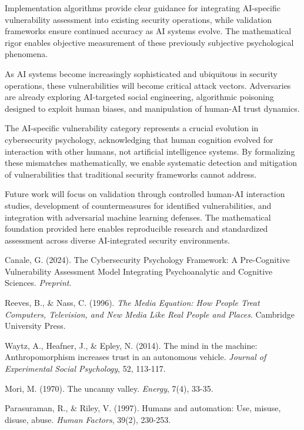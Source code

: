 \documentclass[11pt,a4paper]{article}
\begin{document}
Implementation algorithms provide clear guidance for integrating AI-specific vulnerability assessment into existing security operations, while validation frameworks ensure continued accuracy as AI systems evolve. The mathematical rigor enables objective measurement of these previously subjective psychological phenomena.

As AI systems become increasingly sophisticated and ubiquitous in security operations, these vulnerabilities will become critical attack vectors. Adversaries are already exploring AI-targeted social engineering, algorithmic poisoning designed to exploit human biases, and manipulation of human-AI trust dynamics.

The AI-specific vulnerability category represents a crucial evolution in cybersecurity psychology, acknowledging that human cognition evolved for interaction with other humans, not artificial intelligence systems. By formalizing these mismatches mathematically, we enable systematic detection and mitigation of vulnerabilities that traditional security frameworks cannot address.

Future work will focus on validation through controlled human-AI interaction studies, development of countermeasures for identified vulnerabilities, and integration with adversarial machine learning defenses. The mathematical foundation provided here enables reproducible research and standardized assessment across diverse AI-integrated security environments.

\begin{thebibliography}{9}

Canale, G. (2024). The Cybersecurity Psychology Framework: A Pre-Cognitive Vulnerability Assessment Model Integrating Psychoanalytic and Cognitive Sciences. \textit{Preprint}.

Reeves, B., \& Nass, C. (1996). \textit{The Media Equation: How People Treat Computers, Television, and New Media Like Real People and Places}. Cambridge University Press.

Waytz, A., Heafner, J., \& Epley, N. (2014). The mind in the machine: Anthropomorphism increases trust in an autonomous vehicle. \textit{Journal of Experimental Social Psychology}, 52, 113-117.

Mori, M. (1970). The uncanny valley. \textit{Energy}, 7(4), 33-35.

Parasuraman, R., \& Riley, V. (1997). Humans and automation: Use, misuse, disuse, abuse. \textit{Human Factors}, 39(2), 230-253.

\end{thebibliography}
\end{document}
